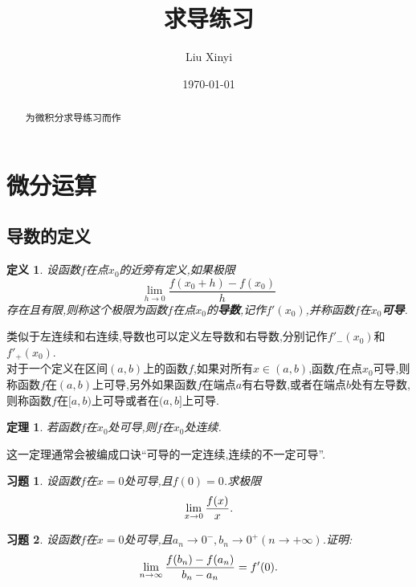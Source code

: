\documentclass{article}
\title{求导练习}
\author{Liu Xinyi}
\date{\today}
\newtheorem{definition}{定义}[subsection]
\newtheorem{theorem}{定理}[subsection]
\newtheorem{exer}{习题}[subsection]
\begin{document}
    
\maketitle
\begin{abstract}
    为微积分求导练习而作
\end{abstract}
\newpage

\section{微分运算}

\subsection{导数的定义}
\begin{definition}
    设函数$f$在点$x_0$的近旁有定义,如果极限
    $$
    \lim_{h\to 0}\frac{f(x_0+h)-f(x_0)}{h}
    $$
    存在且有限,则称这个极限为函数$f$在点$x_0$的\textbf{导数},记作$f'(x_0)$,并称函数$f$在$x_0$\textbf{可导}.
\end{definition}

\noindent 类似于左连续和右连续,导数也可以定义左导数和右导数,分别记作$f'_-(x_0)$和$f'_+(x_0)$.\\

\noindent 对于一个定义在区间$(a,b)$上的函数$f$,如果对所有$x\in (a,b)$,函数$f$在点$x_0$可导,则称函数$f$在$(a,b)$上可导,另外如果函数$f$在端点$a$有右导数,或者在端点$b$处有左导数,则称函数$f$在$[a,b)$上可导或者在$(a,b]$上可导.\\


\begin{theorem}
    若函数$f$在$x_0$处可导,则$f$在$x_0$处连续.
\end{theorem}
\noindent 这一定理通常会被编成口诀“可导的一定连续,连续的不一定可导”.\\

\newpage

\begin{exer}
    设函数$f$在$x=0$处可导,且$f(0)=0$.求极限
    $$
    \lim_{x\to 0}\frac{f(x)}{x}.\\
    $$
\end{exer}
\vspace*{100pt}


\begin{exer}
    设函数$f$在$x=0$处可导,且$a_n\to 0^-,b_n \to 0^+(n\to +\infty)$.证明:
    $$
    \lim_{n\to \infty}\frac{f(b_n)-f(a_n)}{b_n-a_n}=f'(0).\\
    $$
\end{exer}
\vspace*{100pt}
\end{document}
